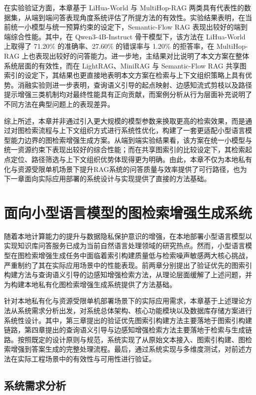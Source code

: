 \documentclass[promaster, vlined]{DissertUESTC}
\begin{document}
在实验验证方面，本章基于 LiHua-World 与 MultiHop-RAG 两类具有代表性的数据集，从端到端问答表现角度系统评估了所提方法的有效性。实验结果表明，在当前统一小模型与统一预算约束的设定下，Semantic-Flow RAG 表现出较好的端到端综合性能。其中，在 Qwen3-4B-Instruct 骨干模型下，该方法在 LiHua-World 上取得了 71.20\% 的准确率、27.60\% 的错误率与 1.20\% 的拒答率，在 MultiHop-RAG 上也表现出较好的问答能力。进一步地，主结果对比说明了本文方案在整体系统层面的有效性，而在 LightRAG、MiniRAG 与 Semantic-Flow RAG 共享图索引的设定下，其结果也更直接地表明本文方案在检索与上下文组织策略上具有优势。消融实验则进一步表明，查询语义引导的起点映射、边感知流式剪枝以及路径提示增强三类机制均对最终性能具有正向贡献，而案例分析从行为层面补充说明了不同方法在典型问题上的表现差异。

综上所述，本章并非通过引入更大规模的模型参数来换取更高的检索效果，而是通过对图检索流程与上下文组织方式进行系统性优化，构建了一套更适配小型语言模型能力边界的图检索增强生成方案。从端到端实验结果看，该方案在统一小模型与统一资源约束下表现出较好的综合性能；而在共享图索引的比较设定下，其检索起点定位、路径筛选与上下文组织优势体现得更为明确。由此，本章不仅为本地私有化与资源受限单机场景下提升RAG系统的问答质量与效率提供了可行路径，也为下一章面向实际应用部署的系统设计与实现提供了直接的方法基础。

\chapter{面向小型语言模型的图检索增强生成系统}

随着本地计算能力的提升与数据隐私保护意识的增强，在本地部署小型语言模型以实现知识库问答服务已成为当前自然语言处理领域的研究热点。然而，小型语言模型在图检索增强生成任务中面临着索引构建质量低与检索噪声敏感两大核心挑战，严重制约了其在实际应用场景中的性能表现。前两章分别提出了验证优先的图索引构建方法与查询语义引导的边感知增强检索方法，从理论层面缓解了上述问题，并为构建本地私有化图检索增强生成系统提供了方法基础。

针对本地私有化与资源受限单机部署场景下的实际应用需求，本章基于上述理论方法从系统需求分析出发，对系统总体架构、核心功能模块以及数据库存储方案进行系统性设计。其中，第三章提出的验证优先图索引构建方法主要落地于图索引构建链路，第四章提出的查询语义引导与边感知增强检索方法主要落地于检索与生成链路。按照既定的设计原则与规范，系统实现了从原始文本接入、图索引构建、图检索增强到答案生成的完整处理流程。最后，通过系统实现与多维度测试，对前述方法在实际工程场景中的有效性与可用性进行验证。

\section{系统需求分析}
\end{document}
